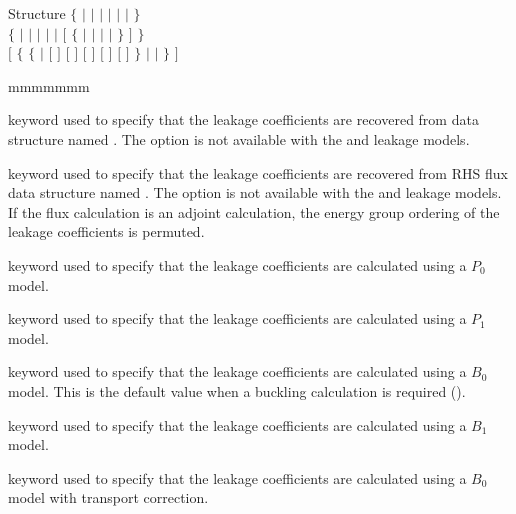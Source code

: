 \begin{DataStructure}{Structure }
$\{$  $|$  $|$ $|$  $|$  $|$  $|$ 
 $\}$ \\
$\{$  $|$  $|$  $|$  $|$  $|$ 
$[$ $\{$  $|$  $|$  $|$  $|$  $\}$ $]$ $\}$ \\
$[$ $\{$  $\{$  $|$ $[$   $]$  
$[$   $]$ $[$   $]$ 
$[$   $]$
$[$   $]$ $\}$
$|$   $|$  $\}$
$]$  \end{DataStructure}

\begin{ListeDeDescription}{mmmmmmm}

\item[\moc{LKRD}] keyword used to specify that the leakage coefficients are
recovered from data structure named . The  option is not
available with the  and  leakage models.

\item[\moc{RHS}] keyword used to specify that the leakage coefficients are
recovered from RHS flux data structure named . The  option is not
available with the  and  leakage models. If the flux calculation is
an adjoint calculation, the energy group ordering of the leakage coefficients is permuted.

\item[\moc{P0}] keyword used to specify that the leakage coefficients are
calculated using a $P_0$ model.

\item[\moc{P1}] keyword used to specify that the leakage coefficients are
calculated using a $P_1$ model. 

\item[\moc{B0}] keyword used to specify that the leakage coefficients are
calculated using a $B_0$ model. This is the default value when a buckling
calculation is required ().

\item[\moc{B1}] keyword used to specify that the leakage coefficients are
calculated using a $B_1$ model.

\item[\moc{B0TR}] keyword used to specify that the leakage coefficients are
calculated using a $B_0$ model with transport correction.


\end{ListeDeDescription}

